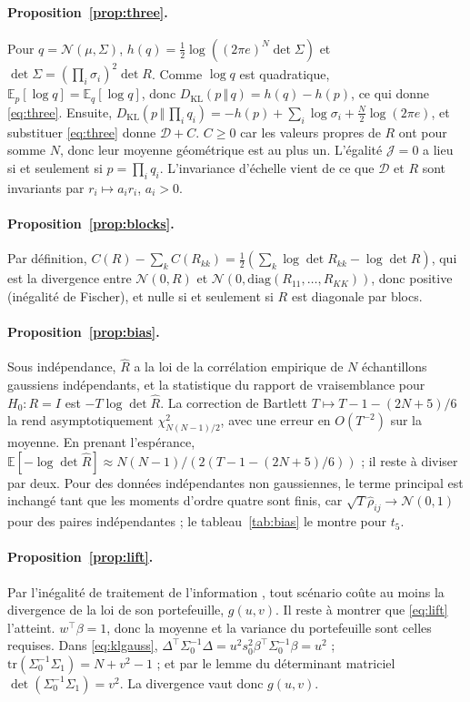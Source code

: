 \documentclass[12pt]{article}
\theoremstyle{definition}
\newcommand{\JJ}{\mathcal{J}}
\newcommand{\DD}{\mathcal{D}}
\newcommand{\KL}[2]{D_{\mathrm{KL}}\!\left(#1\,\Vert\,#2\right)}
\newcommand{\E}{\mathbb{E}}
\begin{document}
\begin{doublespace}
\paragraph{Proposition~\ref{prop:three}.} Pour $q=\mathcal N(\mu,\Sigma)$,
$h(q)=\tfrac12\log((2\pi e)^N\det\Sigma)$ et
$\det\Sigma=(\prod_i\sigma_i)^2\det R$. Comme $\log q$ est quadratique,
$\E_p[\log q]=\E_q[\log q]$, donc $\KL{p}{q}=h(q)-h(p)$, ce qui donne
\eqref{eq:three}. Ensuite,
$\KL{p}{\prod_iq_i}=-h(p)+\sum_i\log\sigma_i+\tfrac N2\log(2\pi e)$, et
substituer \eqref{eq:three} donne $\DD+C$. $C\ge0$ car les valeurs propres de
$R$ ont pour somme $N$, donc leur moyenne géométrique est au plus un.
L'égalité $\JJ=0$ a lieu si et seulement si $p=\prod_iq_i$. L'invariance
d'échelle vient de ce que $\DD$ et $R$ sont invariants par $r_i\mapsto a_ir_i$,
$a_i>0$.

\paragraph{Proposition~\ref{prop:blocks}.} Par définition,
$C(R)-\sum_kC(R_{kk})=\tfrac12(\sum_k\log\det R_{kk}-\log\det R)$, qui est la
divergence entre $\mathcal N(0,R)$ et $\mathcal N(0,\mathrm{diag}(R_{11},
\dots,R_{KK}))$, donc positive (inégalité de Fischer), et nulle si et
seulement si $R$ est diagonale par blocs.

\paragraph{Proposition~\ref{prop:bias}.} Sous indépendance, $\hat R$ a la loi
de la corrélation empirique de $N$ échantillons gaussiens indépendants, et la
statistique du rapport de vraisemblance pour $H_0:R=I$ est
$-T\log\det\hat R$. La correction de Bartlett $T\mapsto T-1-(2N+5)/6$ la rend
asymptotiquement $\chi^2_{N(N-1)/2}$, avec une erreur en $O(T^{-2})$ sur la
moyenne. En prenant l'espérance,
$\E[-\log\det\hat R]\approx N(N-1)/(2(T-1-(2N+5)/6))$ ; il reste à diviser par
deux. Pour des données indépendantes non gaussiennes, le terme principal est
inchangé tant que les moments d'ordre quatre sont finis, car
$\sqrt T\hat\rho_{ij}\to\mathcal N(0,1)$ pour des paires indépendantes ; le
tableau~\ref{tab:bias} le montre pour $t_5$.

\paragraph{Proposition~\ref{prop:lift}.} Par l'inégalité de traitement de
l'information \citep[ch.~2]{cover2006}, tout scénario coûte au moins la
divergence de la loi de son portefeuille, $g(u,v)$. Il reste à montrer que
\eqref{eq:lift} l'atteint. $w^\top\beta=1$, donc la moyenne et la variance du
portefeuille sont celles requises. Dans \eqref{eq:klgauss},
$\Delta^\top\Sigma_0^{-1}\Delta=u^2s_0^2\beta^\top\Sigma_0^{-1}\beta=u^2$ ;
$\mathrm{tr}(\Sigma_0^{-1}\Sigma_1)=N+v^2-1$ ; et par le lemme du déterminant
matriciel $\det(\Sigma_0^{-1}\Sigma_1)=v^2$. La divergence vaut donc
$g(u,v)$.


\end{doublespace}
\end{document}
